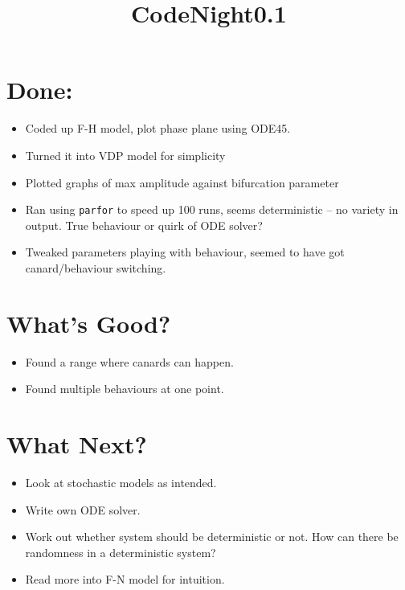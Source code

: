 \documentclass[11pt,a4paper]{article}
\title{{CodeNight0.1}}
\begin{document}
\maketitle

\section{Done:}
\begin{itemize}
	\item Coded up F-H model, plot phase plane using ODE45. 
	\item Turned it into VDP model for simplicity
	\item Plotted graphs of max amplitude against bifurcation parameter
	\item Ran using \texttt{parfor} to speed up 100 runs, seems deterministic -- no variety in output. True behaviour or quirk of ODE solver?
	\item Tweaked parameters playing with behaviour, seemed to have got canard/behaviour switching.
\end{itemize}
\section{What's Good?}
\begin{itemize}
	\item Found a range where canards can happen.
	\item Found multiple behaviours at one point.
\end{itemize}
\section{What Next?}
\begin{itemize}
	\item Look at stochastic models as intended.
	\item Write own ODE solver.
	\item Work out whether system should be deterministic or not. How can there be randomness in a deterministic system?
	\item Read more into F-N model for intuition.
\end{itemize}
\end{document}
